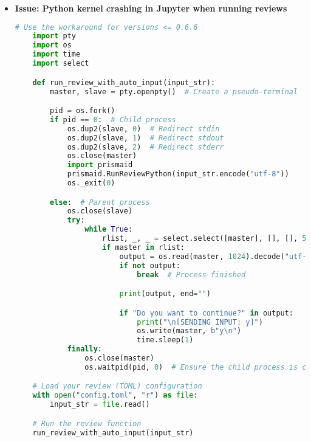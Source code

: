\begin{itemize}
    \item \textbf{Issue: Python kernel crashing in Jupyter when running reviews}

    \begin{commandbox}
    \begin{lstlisting}[language=Python]
    # Use the workaround for versions <= 0.6.6
    import pty
    import os
    import time
    import select

    def run_review_with_auto_input(input_str):
        master, slave = pty.openpty()  # Create a pseudo-terminal

        pid = os.fork()
        if pid == 0:  # Child process
            os.dup2(slave, 0)  # Redirect stdin
            os.dup2(slave, 1)  # Redirect stdout
            os.dup2(slave, 2)  # Redirect stderr
            os.close(master)
            import prismaid
            prismaid.RunReviewPython(input_str.encode("utf-8"))
            os._exit(0)

        else:  # Parent process
            os.close(slave)
            try:
                while True:
                    rlist, _, _ = select.select([master], [], [], 5)
                    if master in rlist:
                        output = os.read(master, 1024).decode("utf-8", errors="ignore")
                        if not output:
                            break  # Process finished

                        print(output, end="")

                        if "Do you want to continue?" in output:
                            print("\n[SENDING INPUT: y]")
                            os.write(master, b"y\n")
                            time.sleep(1)
            finally:
                os.close(master)
                os.waitpid(pid, 0)  # Ensure the child process is cleaned up

    # Load your review (TOML) configuration
    with open("config.toml", "r") as file:
        input_str = file.read()

    # Run the review function
    run_review_with_auto_input(input_str)
    \end{lstlisting}
    \end{commandbox}

\end{itemize}

